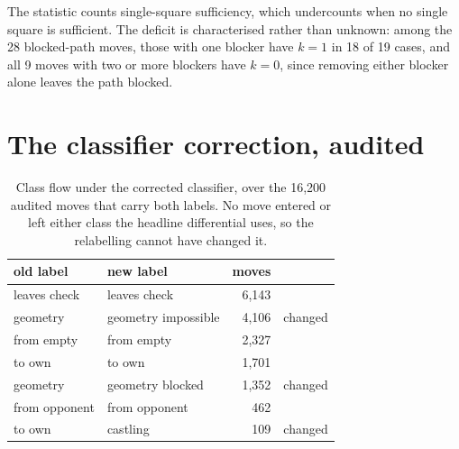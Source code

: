 \documentclass[11pt]{article}
\begin{document}
The statistic counts single-square sufficiency, which undercounts when no single square is sufficient. The deficit is characterised rather than unknown: among the 28 blocked-path moves, those with one blocker have $k=1$ in 18 of 19 cases, and all 9 moves with two or more blockers have $k=0$, since removing either blocker alone leaves the path blocked.

\section{The classifier correction, audited}

\begin{table}[htbp]
\centering\small
\caption{Class flow under the corrected classifier, over the 16,200 audited moves that carry both labels. No move entered or left either class the headline differential uses, so the relabelling cannot have changed it.}
\label{tab:s-flow}
\begin{tabular}{llrl}
\toprule
old label & new label & moves &  \\
\midrule
leaves check & leaves check & 6,143 &  \\
geometry & geometry impossible & 4,106 & changed \\
from empty & from empty & 2,327 &  \\
to own & to own & 1,701 &  \\
geometry & geometry blocked & 1,352 & changed \\
from opponent & from opponent & 462 &  \\
to own & castling & 109 & changed \\
\bottomrule
\end{tabular}
\end{table}
\end{document}
